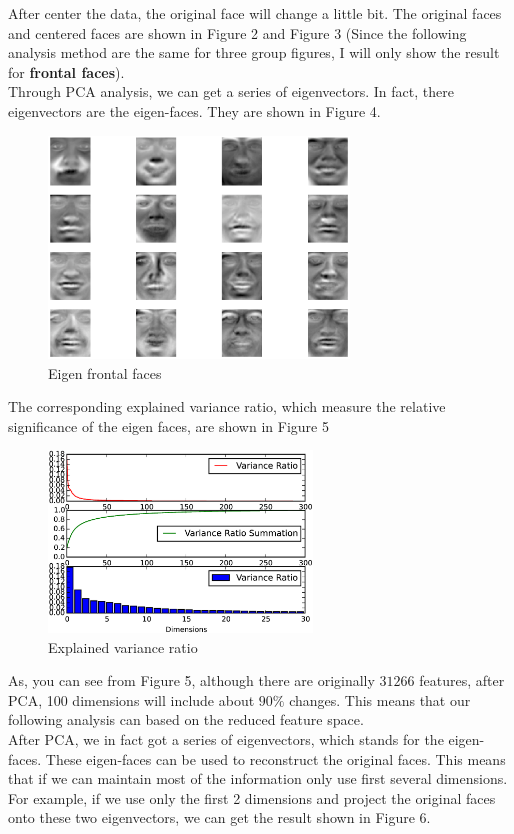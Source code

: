 \documentclass[11pt]{article}
\begin{document}
After center the data, the original face will change a little bit. The original faces and centered faces are shown in Figure 2 and Figure 3 (Since the following analysis method are the same for three group figures, I will only show the result for {\bf frontal faces}).\\

Through PCA analysis, we can get a series of eigenvectors. In fact, there eigenvectors are the eigen-faces. They are shown in Figure 4.

\begin{figure}[H]
\centering
\includegraphics[width=80mm]{eigenFace.png}
\caption{Eigen frontal faces}
\label{Fig2.lable}
\end{figure}

The corresponding explained variance ratio, which measure the relative significance of the eigen faces, are shown in Figure 5

\begin{figure}[H]
\centering
\includegraphics[width=70mm]{ratioChange.png}
\caption{Explained variance ratio}
\label{Fig2.lable}
\end{figure}

As, you can see from Figure 5, although there are originally $31266$ features, after PCA, 100 dimensions will include about $90\%$ changes. This means that our following analysis can based on the reduced feature space.\\

After PCA, we in fact got a series of eigenvectors, which stands for the eigen-faces. These eigen-faces can be used to reconstruct the original faces. This means that if we can maintain most of the information only use first several dimensions. For example, if we use only the first 2 dimensions and project the original faces onto these two eigenvectors, we can get the result shown in Figure 6.
\end{document}
